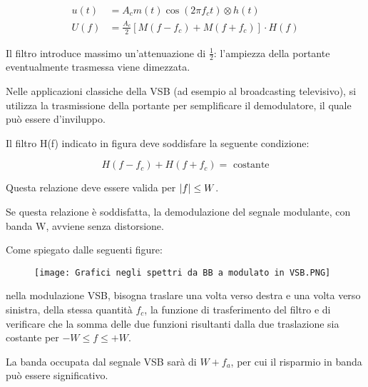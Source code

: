 {
    \Large 
    \begin{equation}
        \begin{split}
        u (t) 
        &= 
        A_c m(t) \cos(2 \pi f_c t) 
        \otimes
        h(t)
        \\
        U(f)
        &= 
        \frac{A_c}{2}
        \left[
            M(f - f_c) 
            +
            M(f + f_c)
        \right] 
        \cdot 
        H(f)
        \end{split}
    \end{equation}
}

Il filtro introduce massimo un'attenuazione di $\frac{1}{2}$: l'ampiezza della portante eventualmente trasmessa viene dimezzata. \newline 

Nelle applicazioni classiche della VSB (ad esempio al broadcasting televisivo), si utilizza la trasmissione della portante per semplificare il demodulatore, il quale può essere d'inviluppo. \newline 

Il filtro H(f) indicato in figura deve soddisfare la seguente condizione: 

{
    \Large 
    \begin{equation}
        H(f - f_c) 
        + 
        H(f + f_c)
        = 
        \text{ costante} 
    \end{equation}
}

Questa relazione deve essere valida per $\abs{f} \le W$. \newline 

Se questa relazione è soddisfatta, la demodulazione del segnale modulante, con banda W, avviene senza distorsione. \newline 

Come spiegato dalle seguenti figure: 

\begin{figure}[h]
    \centering
    \texttt{[image: Grafici negli spettri da BB a modulato in VSB.PNG]}
\end{figure} 

nella modulazione VSB, bisogna traslare una volta verso destra e una volta verso sinistra, della stessa quantità $f_c$, 
la funzione di trasferimento del filtro e di verificare che la somma delle due funzioni risultanti dalla due traslazione sia costante per $- W \le f \le +W$. \newline 

La banda occupata dal segnale VSB sarà di $W + f_a$, per cui il risparmio in banda può essere significativo. \newline 

